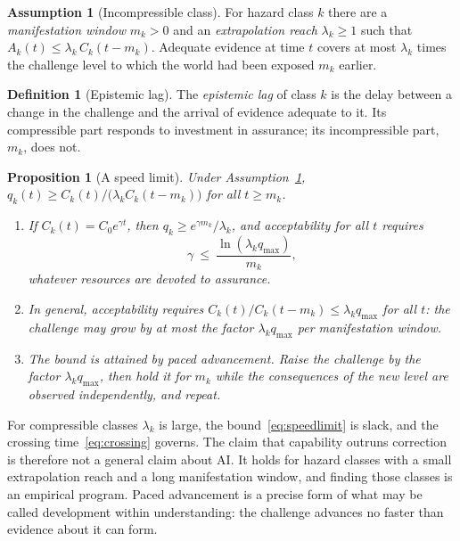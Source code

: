 \documentclass[11pt]{article}
\theoremstyle{plain}
\newtheorem{proposition}{Proposition}
\theoremstyle{definition}
\newtheorem{definition}{Definition}
\newtheorem{assumption}{Assumption}
\newcommand{\qmax}{q_{\max}}
\begin{document}
\begin{assumption}[Incompressible class]\label{ass:incompressible}
For hazard class $k$ there are a \emph{manifestation window} $m_k>0$ and an \emph{extrapolation reach} $\lambda_k\ge1$ such that $A_k(t)\le\lambda_k\,C_k(t-m_k)$. Adequate evidence at time $t$ covers at most $\lambda_k$ times the challenge level to which the world had been exposed $m_k$ earlier.
\end{assumption}

\begin{definition}[Epistemic lag]\label{def:lag}
The \emph{epistemic lag} of class $k$ is the delay between a change in the challenge and the arrival of evidence adequate to it. Its compressible part responds to investment in assurance; its incompressible part, $m_k$, does not.
\end{definition}

\begin{proposition}[A speed limit]\label{prop:speedlimit}
Under Assumption~\ref{ass:incompressible}, $q_k(t)\ge C_k(t)/\big(\lambda_kC_k(t-m_k)\big)$ for all $t\ge m_k$.
\begin{enumerate}[label=(\roman*),leftmargin=*]
\item If $C_k(t)=C_0e^{\gamma t}$, then $q_k\ge e^{\gamma m_k}/\lambda_k$, and acceptability for all $t$ requires
\begin{equation}\label{eq:speedlimit}
\gamma\ \le\ \frac{\ln(\lambda_k\qmax)}{m_k},
\end{equation}
whatever resources are devoted to assurance.
\item In general, acceptability requires $C_k(t)/C_k(t-m_k)\le\lambda_k\qmax$ for all $t$: the challenge may grow by at most the factor $\lambda_k\qmax$ per manifestation window.
\item The bound is attained by \emph{paced advancement}. Raise the challenge by the factor $\lambda_k\qmax$, then hold it for $m_k$ while the consequences of the new level are observed independently, and repeat.
\end{enumerate}
\end{proposition}

For compressible classes $\lambda_k$ is large, the bound~\eqref{eq:speedlimit} is slack, and the crossing time~\eqref{eq:crossing} governs. The claim that capability outruns correction is therefore not a general claim about AI. It holds for hazard classes with a small extrapolation reach and a long manifestation window, and finding those classes is an empirical program. Paced advancement is a precise form of what may be called development within understanding: the challenge advances no faster than evidence about it can form.
\end{document}
